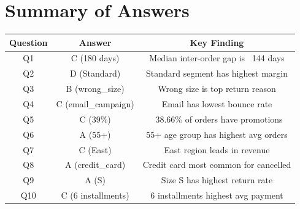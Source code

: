 \documentclass{article}
\begin{document}
\bigskip

\section*{Summary of Answers}

\begin{table}[h]
\centering
\begin{tabular}{ccc}
\toprule
\textbf{Question} & \textbf{Answer} & \textbf{Key Finding} \\
\midrule
Q1 & C (180 days) & Median inter-order gap is ~144 days \\
Q2 & D (Standard) & Standard segment has highest margin \\
Q3 & B (wrong\_size) & Wrong size is top return reason \\
Q4 & C (email\_campaign) & Email has lowest bounce rate \\
Q5 & C (39\%) & ~38.66\% of orders have promotions \\
Q6 & A (55+) & 55+ age group has highest avg orders \\
Q7 & C (East) & East region leads in revenue \\
Q8 & A (credit\_card) & Credit card most common for cancelled \\
Q9 & A (S) & Size S has highest return rate \\
Q10 & C (6 installments) & 6 installments highest avg payment \\
\bottomrule
\end{tabular}
\end{table}
\end{document}
